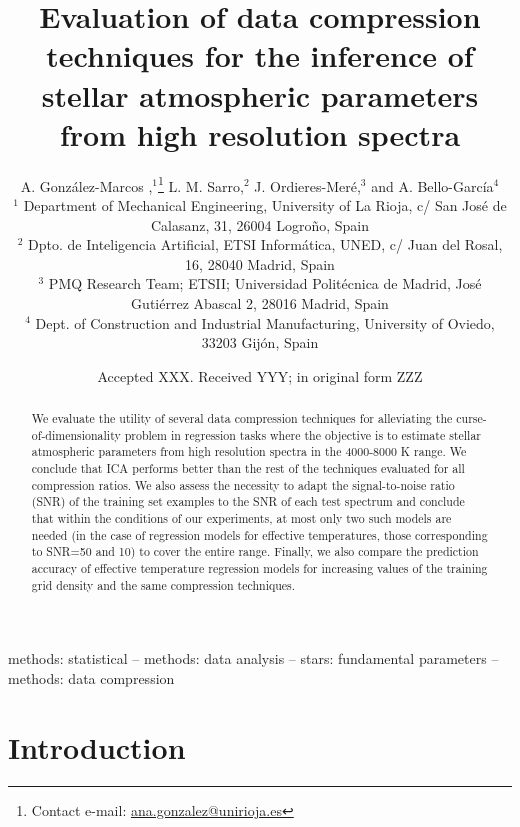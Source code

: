 \documentclass[a4paper,fleqn,usenatbib]{mnras}
\title[]{Evaluation of data compression techniques for the inference of
  stellar atmospheric parameters from high resolution spectra}
\author[A. Gonz\'alez-Marcos et al.]{
A. Gonz\'alez-Marcos ,$^{1}$\thanks{Contact e-mail: \href{mailto:}{ana.gonzalez@unirioja.es}}
L. M. Sarro,$^{2}$
J. Ordieres-Mer\'e,$^{3}$
and A. Bello-Garc\'ia$^{4}$
\\
$^{1}$ Department of Mechanical Engineering, University of La Rioja, c/ San Jos\'e de Calasanz, 31, 26004 Logroño, Spain  \\
$^{2}$ Dpto. de Inteligencia Artificial, ETSI Inform\'atica, UNED, c/ Juan del Rosal, 16, 28040 Madrid, Spain \\
$^{3}$ PMQ Research Team; ETSII; Universidad Polit\'ecnica de Madrid, José Guti\'errez Abascal 2, 28016 Madrid, Spain\\
$^{4}$ Dept. of Construction and Industrial Manufacturing, University of Oviedo, 33203 Gij\'on, Spain\\
}
\date{Accepted XXX. Received YYY; in original form ZZZ}
\begin{document}
\label{firstpage}
\pagerange{\pageref{firstpage}--\pageref{lastpage}}
\maketitle

\begin{abstract}
We evaluate the utility of several data compression techniques
  for alleviating the curse-of-dimensionality problem in regression
  tasks where the objective is to estimate stellar atmospheric
  parameters from high resolution spectra in the 4000-8000 K range. We
  conclude that ICA performs better than the rest of the
  techniques evaluated for all compression ratios. We also assess the
  necessity to adapt the signal-to-noise ratio (SNR) of the training
  set examples to the SNR of each test spectrum and conclude that
  within the conditions of our experiments, at most only two such models are
  needed (in the case of regression models for effective temperatures, 
  those corresponding to SNR=50 and 10) to cover the entire range. Finally, we also 
  compare the prediction accuracy of effective 
  temperature regression models for increasing values of the training grid 
  density and the same compression techniques. 
\end{abstract}

\begin{keywords}
methods: statistical -- methods: data analysis -- stars: fundamental parameters -- methods: data compression
\end{keywords}



\section{Introduction}
\end{document}
